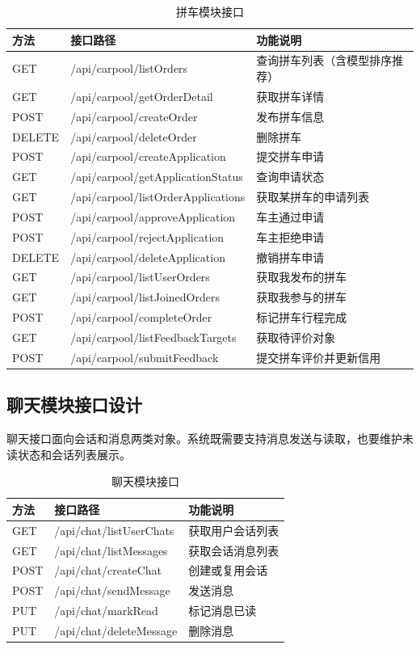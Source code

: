 \begin{table}[!htbp]
  \caption{拼车模块接口}
  \label{tab:carpool-api}
  \centering
  \small
  \begin{tabular}{p{1.6cm}p{4.6cm}p{6.2cm}}
    \toprule
    方法 & 接口路径 & 功能说明 \\
    \midrule
    GET & /api/carpool/listOrders & 查询拼车列表（含模型排序推荐） \\
    GET & /api/carpool/getOrderDetail & 获取拼车详情 \\
    POST & /api/carpool/createOrder & 发布拼车信息 \\
    DELETE & /api/carpool/deleteOrder & 删除拼车 \\
    POST & /api/carpool/createApplication & 提交拼车申请 \\
    GET & /api/carpool/getApplicationStatus & 查询申请状态 \\
    GET & /api/carpool/listOrderApplications & 获取某拼车的申请列表 \\
    POST & /api/carpool/approveApplication & 车主通过申请 \\
    POST & /api/carpool/rejectApplication & 车主拒绝申请 \\
    DELETE & /api/carpool/deleteApplication & 撤销拼车申请 \\
    GET & /api/carpool/listUserOrders & 获取我发布的拼车 \\
    GET & /api/carpool/listJoinedOrders & 获取我参与的拼车 \\
    POST & /api/carpool/completeOrder & 标记拼车行程完成 \\
    GET & /api/carpool/listFeedbackTargets & 获取待评价对象 \\
    POST & /api/carpool/submitFeedback & 提交拼车评价并更新信用 \\
    \bottomrule
  \end{tabular}
\end{table}

\subsection{聊天模块接口设计}

聊天接口面向会话和消息两类对象。系统既需要支持消息发送与读取，也要维护未读状态和会话列表展示。

\begin{table}[!htbp]
  \caption{聊天模块接口}
  \label{tab:chat-api}
  \centering
  \small
  \begin{tabular}{p{1.6cm}p{4.6cm}p{6.2cm}}
    \toprule
    方法 & 接口路径 & 功能说明 \\
    \midrule
    GET & /api/chat/listUserChats & 获取用户会话列表 \\
    GET & /api/chat/listMessages & 获取会话消息列表 \\
    POST & /api/chat/createChat & 创建或复用会话 \\
    POST & /api/chat/sendMessage & 发送消息 \\
    PUT & /api/chat/markRead & 标记消息已读 \\
    PUT & /api/chat/deleteMessage & 删除消息 \\
    \bottomrule
  \end{tabular}
\end{table}

